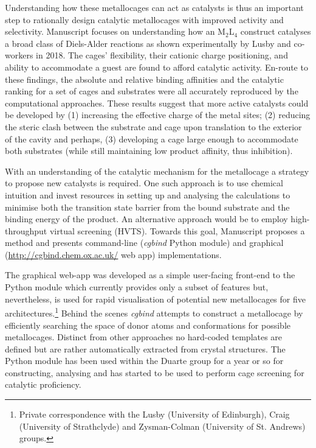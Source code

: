 \documentclass[../../main.tex]{subfiles}
\begin{document}
Understanding how these metallocages can act as catalysts is thus an important step to rationally design catalytic metallocages with improved activity and selectivity. Manuscript  focuses on understanding how an M$_2$L$_4$ construct catalyses a broad class of Diels-Alder reactions as shown experimentally by Lusby and co-workers in 2018.\cite{MartCentelles2018} The cages' flexibility, their cationic charge positioning, and ability to accommodate a guest are found to afford catalytic activity. En-route to these findings, the absolute and relative binding affinities and the catalytic ranking for a set of cages and substrates were all accurately reproduced by the computational approaches. These results suggest that more active catalysts could be developed by (1) increasing the effective charge of the metal sites; (2) reducing the steric clash between the substrate and cage upon translation to the exterior of the cavity and perhaps, (3) developing a cage large enough to accommodate both substrates (while still maintaining low product affinity, thus inhibition).

With an understanding of the catalytic mechanism for the metallocage a strategy to propose new catalysts is required. One such approach is to use chemical intuition and invest resources in setting up and analysing the calculations to minimise both the transition state barrier from the bound substrate and the binding energy of the product. An alternative approach would be to employ high-throughput virtual screening (HVTS). Towards this goal, Manuscript  proposes a method and presents command-line (\emph{cgbind} Python module) and graphical ({\url{http://cgbind.chem.ox.ac.uk/}} web app)  implementations.

The graphical web-app was developed as a simple user-facing front-end to the Python module which currently provides only a subset of features but, nevertheless, is used for rapid visualisation of potential new metallocages for five architectures.\footnote{Private correspondence with the Lusby (University of Edinburgh), Craig (University of Strathclyde) and Zysman-Colman (University of St. Andrews) groups.} Behind the scenes \emph{cgbind} attempts to construct a metallocage by efficiently searching the space of donor atoms and conformations for possible metallocages. Distinct from other approaches\cite{Turcani2018} no hard-coded templates are defined but are rather automatically extracted from crystal structures. The Python module has been used within the Duarte group for a year or so for constructing, analysing and has started to be used to perform cage screening for catalytic proficiency.

\clearpage
\end{document}
